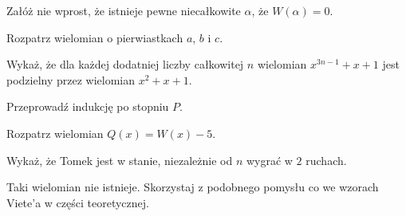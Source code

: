 
\begin{hints_list}
	\item Załóż nie wprost, że istnieje pewne niecałkowite $\alpha$, że $W(\alpha) = 0$.
	\item Rozpatrz wielomian o pierwiastkach $a$, $b$ i $c$.
	\item Wykaż, że dla każdej dodatniej liczby całkowitej $n$ wielomian $x^{3n - 1} + x + 1$ jest podzielny przez wielomian $x^2 + x + 1$.
	\item Przeprowadź indukcję po stopniu $P$.
	\item Rozpatrz wielomian $Q(x) = W(x) - 5$.
	\item Wykaż, że Tomek jest w stanie, niezależnie od $n$ wygrać w $2$ ruchach.
	\item Taki wielomian nie istnieje. Skorzystaj z podobnego pomysłu co we wzorach Viete'a w części teoretycznej.
\end{hints_list}